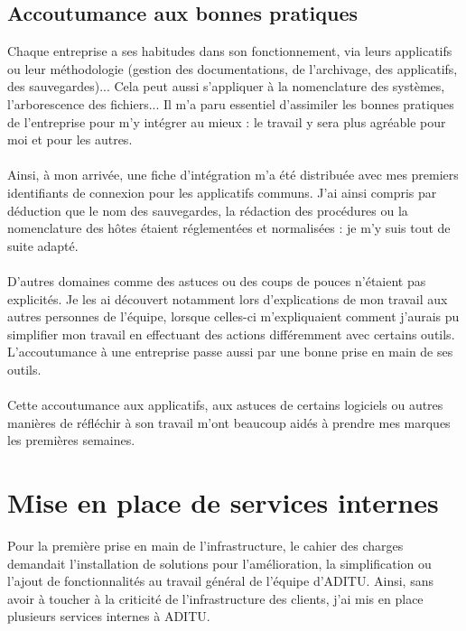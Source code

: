 

\subsection{Accoutumance aux bonnes pratiques}

Chaque entreprise a ses habitudes dans son fonctionnement, via leurs applicatifs ou leur méthodologie (gestion des documentations, de l'archivage, des applicatifs, des sauvegardes)... Cela peut aussi s'appliquer à la nomenclature des systèmes, l'arborescence des fichiers... Il m'a paru essentiel d'assimiler les bonnes pratiques de l'entreprise pour m'y intégrer au mieux : le travail y sera plus agréable pour moi et pour les autres.
\\ \\
Ainsi, à mon arrivée, une fiche d'intégration m'a été distribuée avec mes premiers identifiants de connexion pour les applicatifs communs. J'ai ainsi compris par déduction que le nom des sauvegardes, la rédaction des procédures ou la nomenclature des hôtes étaient réglementées et normalisées : je m'y suis tout de suite adapté.
\\ \\
D'autres domaines comme des astuces ou des coups de pouces n'étaient pas explicités. Je les ai découvert notamment lors d'explications de mon travail aux autres personnes de l'équipe, lorsque celles-ci m'expliquaient comment j'aurais pu simplifier mon travail en effectuant des actions différemment avec certains outils. L'accoutumance à une entreprise passe aussi par une bonne prise en main de ses outils.
\\ \\
Cette accoutumance aux applicatifs, aux astuces de certains logiciels ou autres manières de réfléchir à son travail m'ont beaucoup aidés à prendre mes marques les premières semaines.

\section{Mise en place de services internes}

Pour la première prise en main de l'infrastructure, le cahier des charges demandait l'installation de solutions pour l'amélioration, la simplification ou l'ajout de fonctionnalités au travail général de l'équipe d'ADITU. Ainsi, sans avoir à toucher à la criticité de l'infrastructure des clients, j'ai mis en place plusieurs services internes à ADITU.

